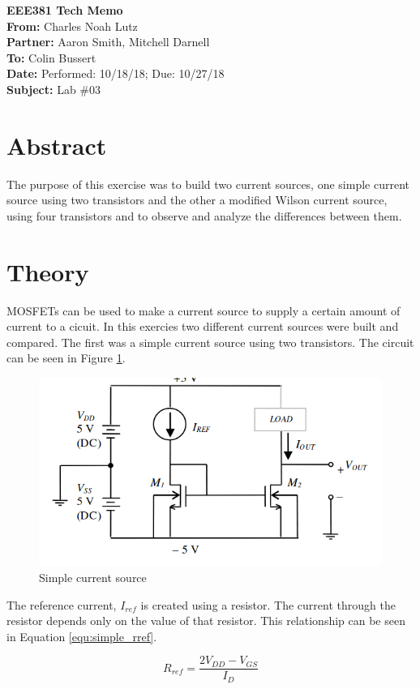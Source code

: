 \documentclass[11pt]{article}
\begin{document}
	{\Huge\textbf{EEE381 Tech Memo}}\\
	\hfill \break
	\textbf{From:} Charles Noah Lutz\\
	\textbf{Partner:} Aaron Smith, Mitchell Darnell\\
	\textbf{To:} Colin Bussert\\
	\textbf{Date:} Performed: 10/18/18; Due: 10/27/18\\
	\textbf{Subject:} Lab \#03

	\section{Abstract}
	The purpose of this exercise was to build two current sources, one
	simple current source using two transistors and the other a modified
	Wilson current source, using four transistors and to observe and
	analyze the differences between them.
	
	\section{Theory}
	MOSFETs can be used to make a current source to supply a certain amount of
	current to a cicuit. In this exercies two different current sources were 
	built and compared. The first was a simple current source using two transistors.
	The circuit can be seen in Figure \ref{fig:simple}.

	\begin{figure}[H]
		\centering
		\includegraphics[width=4.0 in]{simple_current.png}
		\caption{Simple current source}
		\label{fig:simple}
	\end{figure}

	The reference current, $I_{ref}$ is created using a resistor. The current 
	through the resistor depends only on the value of that resistor. This 
	relationship can be seen in Equation \ref{equ:simple_rref}.

	\begin{equation}
		\label{equ:simple_rref}
		R_{ref} = \frac{2V_{DD} - V_{GS}}{I_D}
	\end{equation}
	
\end{document}
